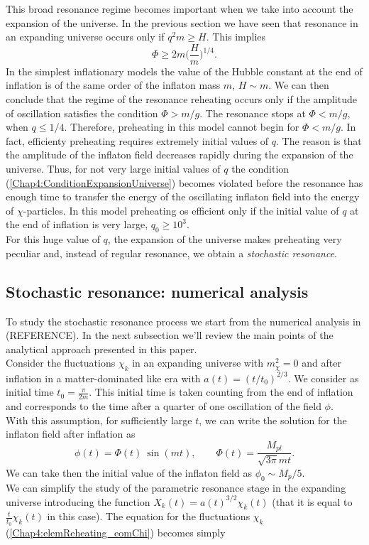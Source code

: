 \documentclass[11pt,a4paper,twoside]{book}
\begin{document}
This broad resonance regime becomes important when we take into account the expansion of the universe. In the previous section we have seen that resonance in an expanding universe occurs only if $ q^{2}m \ge H $. This implies
\begin{equation}
	\label{Chap4:ConditionExpansionUniverse}
	\Phi \ge 2m\Bigg(\frac{H}{m}\Bigg)^{1/4}.
\end{equation}
In the simplest inflationary models the value of the Hubble constant at the end of inflation is of the same order of the inflaton mass $ m $, $ H \sim m $. We can then conclude that the regime of the resonance reheating occurs only if the amplitude of oscillation satisfies the condition $ \Phi > m/g $. The resonance stops at $ \Phi < m/g $, when $ q \le 1/4 $. Therefore, preheating in this model cannot begin for $ \Phi < m/g $. In fact, efficienty preheating requires extremely initial values of $ q $. The reason is that the amplitude of the inflaton field decreases rapidly during the expansion of the universe. Thus, for not very large initial values of $ q $ the condition (\ref{Chap4:ConditionExpansionUniverse}) becomes violated before the resonance has enough time to transfer the energy of the oscillating inflaton field into the energy of $ \chi $-particles. In this model preheating os efficient only if the initial value of $ q $ at the end of inflation is very large, $ q_{0} \ge 10^{3} $.\\
For this huge value of $ q $, the expansion of the universe makes preheating very peculiar and, instead of regular resonance, we obtain a  \textit{ stochastic resonance}.
\subsection{Stochastic resonance: numerical analysis}
To study the stochastic resonance process we start from the numerical analysis in (REFERENCE). In the next subsection we'll review the main points of the analytical approach presented in this paper.\\
Consider the fluctuations $\chi_{k}$ in an expanding universe with $ m^{2}_{\chi}=0 $ and after inflation in a matter-dominated like era with $ a(t)=(t/t_{0})^{2/3} $. We consider as initial time $ t_{0}=\frac{\pi}{2m} $. This initial time is taken counting from the end of inflation and corresponds to the time after a quarter of one oscillation of the field $\phi$. \\
With this assumption, for sufficiently large $ t $, we can write the solution for the inflaton field after inflation as 
\begin{equation}
\label{Chap4:solutionInflaton}
\phi(t)=\Phi(t)\ \sin(mt),
\qquad
\Phi(t) = \frac{M_{pl}}{\sqrt{3\pi}mt}.
\end{equation}
We can take then the initial value of the inflaton field as $ \phi_{0}\sim M_{p}/5 $.\\
We can simplify the study of the parametric resonance stage in the expanding universe introducing the function $ X_{k}(t)=a(t)^{3/2}\chi_{k}(t) $ (that it is equal to $ \frac{t}{t_{0}}\chi_{k}(t) $ in this case). The equation for the fluctuations $ \chi_{k} $ (\ref{Chap4:elemReheating_eomChi}) becomes simply
\end{document}
